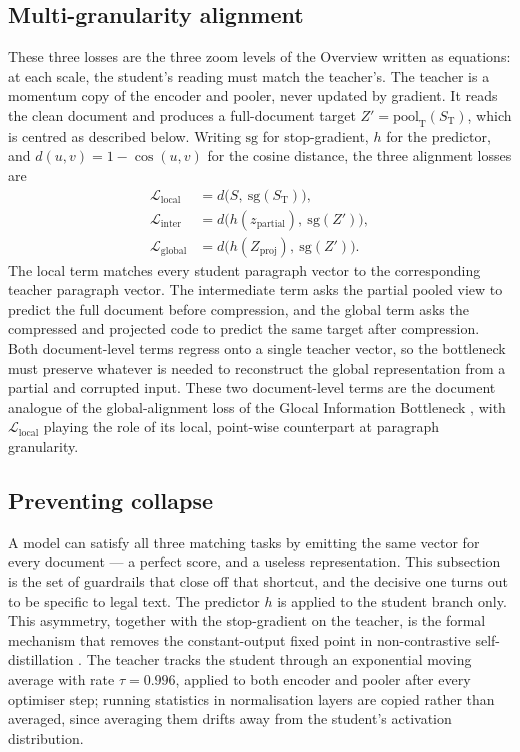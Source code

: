 \documentclass[conference]{IEEEtran}
\begin{document}
\subsection{Multi-granularity alignment}
These three losses are the three zoom levels of the Overview written as equations: at
each scale, the student's reading must match the teacher's. The teacher is a momentum
copy of the encoder and pooler, never updated by gradient.
It reads the clean document and produces a full-document target
$Z' = \mathrm{pool}_{\mathrm{T}}(S_{\mathrm{T}})$, which is centred as described
below. Writing $\mathrm{sg}$ for stop-gradient, $h$ for the predictor, and
$d(u,v) = 1 - \cos(u,v)$ for the cosine distance, the three alignment losses are
\begin{align}
\mathcal{L}_{\mathrm{local}} &= d\big(S,\ \mathrm{sg}(S_{\mathrm{T}})\big), \label{eq:align}\\
\mathcal{L}_{\mathrm{inter}} &= d\big(h(z_{\mathrm{partial}}),\ \mathrm{sg}(Z')\big), \\
\mathcal{L}_{\mathrm{global}} &= d\big(h(Z_{\mathrm{proj}}),\ \mathrm{sg}(Z')\big).
\end{align}
The local term matches every student paragraph vector to the corresponding teacher
paragraph vector. The intermediate term asks the partial pooled view to predict the
full document before compression, and the global term asks the compressed and
projected code to predict the same target after compression. Both document-level
terms regress onto a single teacher vector, so the bottleneck must preserve whatever
is needed to reconstruct the global representation from a partial and corrupted
input. These two document-level terms are the document analogue of the
global-alignment loss of the Glocal Information Bottleneck \cite{yang2025glocal},
with $\mathcal{L}_{\mathrm{local}}$ playing the role of its local, point-wise
counterpart at paragraph granularity.

\subsection{Preventing collapse}
A model can satisfy all three matching tasks by emitting the same vector for every
document --- a perfect score, and a useless representation. This subsection is the
set of guardrails that close off that shortcut, and the decisive one turns out to be
specific to legal text. The predictor $h$ is applied to the student branch only. This asymmetry, together
with the stop-gradient on the teacher, is the formal mechanism that removes the
constant-output fixed point in non-contrastive self-distillation
\cite{grill2020bootstrap,chen2021exploring}. The teacher tracks the student through
an exponential moving average with rate $\tau = 0.996$, applied to both encoder and
pooler after every optimiser step; running statistics in normalisation layers are
copied rather than averaged, since averaging them drifts away from the student's
activation distribution.
\end{document}
